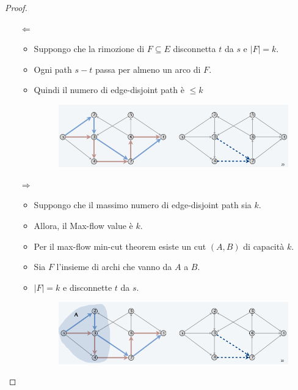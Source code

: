 \begin{proof}\
	\begin{itemize}
		\item[$\Leftarrow$]
			\begin{itemize}
				\item Suppongo che la rimozione di $F \subseteq E$ disconnetta
				      $t$ da $s$ e $|F| = k$.
				\item Ogni path $s-t$ passa per almeno un arco di $F$.
				\item Quindi il numero di edge-disjoint path è $\le k$
				      \begin{figure}[H]
					      \centering
					      \includegraphics[width = 12cm]{capitoli/network_flow/imgs/bipartite4.png}
				      \end{figure}
			\end{itemize}
		\item[$\Rightarrow$]
			\begin{itemize}
				\item Suppongo che il massimo numero di edge-disjoint path sia $k$.
				\item Allora, il Max-flow value è $k$.
				\item Per il max-flow min-cut theorem esiste un cut $(A,B)$ di capacità $k$.
				\item Sia $F$ l'insieme di archi che vanno da $A$ a $B$.
				\item $|F| = k$ e disconnette $t$ da $s$.
				      \begin{figure}[H]
					      \centering
					      \includegraphics[width = 12cm]{capitoli/network_flow/imgs/bipartite5.png}
				      \end{figure}
			\end{itemize}
	\end{itemize}
\end{proof}